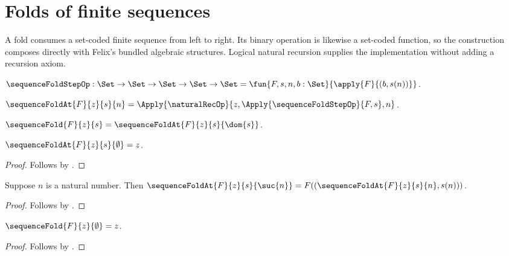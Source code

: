 \section{Folds of finite sequences}




A fold consumes a set-coded finite sequence from left to right.  Its binary
operation is likewise a set-coded function, so the construction composes
directly with Felix's bundled algebraic structures.  Logical natural
recursion supplies the implementation without adding a recursion axiom.

\begin{definition}\label{sequence_fold_step}
    $\sequenceFoldStepOp:
        \Set\to\Set\to\Set\to\Set\to\Set
        =\fun{F,s,n,b:\Set}{
                        \apply{F}{(b,s(n))}}$.
\end{definition}

\begin{definition}\label{sequence_fold_at}
    $\sequenceFoldAt{F}{z}{s}{n}=
        \Apply{\naturalRecOp}{z,
                    \Apply{\sequenceFoldStepOp}{F,s},n}$.
\end{definition}

\begin{definition}\label{sequence_fold}
    $\sequenceFold{F}{z}{s}=
        \sequenceFoldAt{F}{z}{s}{\dom{s}}$.
\end{definition}

\begin{proposition}\label{sequence_fold_at_zero}
    $\sequenceFoldAt{F}{z}{s}{\emptyset}=z$.
\end{proposition}
\begin{proof}
    Follows by
        .
\end{proof}

\begin{proposition}\label{sequence_fold_at_successor}
    Suppose $n$ is a natural number.
    Then
        $\sequenceFoldAt{F}{z}{s}{\suc{n}}
            =F((\sequenceFoldAt{F}{z}{s}{n},s(n)))$.
\end{proposition}
\begin{proof}
    Follows by
        .
\end{proof}

\begin{proposition}\label{sequence_fold_empty}
    $\sequenceFold{F}{z}{\emptyset}=z$.
\end{proposition}
\begin{proof}
    Follows by
        .
\end{proof}

